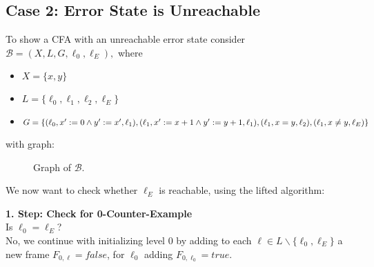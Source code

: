 \documentclass[11pt, a4paper, BCOR=10mm, ngerman]{scrbook}
\begin{document}
\pagebreak

\subsection{Case 2: Error State is Unreachable}
To show a CFA with an unreachable error state consider $\mathcal{B} = (X, L, G, \ell_0, \ell_E),$ where
\begin{itemize}
\item $X = \{x, y\}$
\item $L = \{\ell_0, \ell_1, \ell_2, \ell_E\}$
\item $G = \{(\ell_0, x' := 0 \land y' := x', \ell_1), (\ell_1, x' := x+1 \land y' := y+1, \ell_1),\\ (\ell_1, x = y, \ell_2), (\ell_1, x \neq y, \ell_E) \}$
\end{itemize}

with graph: \\


\begin{figure}[H]
\centering
\hspace*{3cm}
  \caption{Graph of $\mathcal{B}$.}
 \end{figure}
 \label{ex1} 

We now want to check whether $\ell_E$ is reachable, using the lifted algorithm: \par

\textbf{1. Step: Check for 0-Counter-Example} \\
Is $\ell_0 = \ell_E$? \\
No, we continue with initializing level 0 by adding to each $\ell \in L \backslash \{\ell_0, \ell_E\}$ a new frame $F_{0, \ell} = false$, for $\ell_0$ adding $F_{0, \ell_0} = true$. \\ \\
\end{document}
